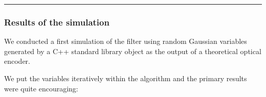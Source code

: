 \begin{center}\rule{0.5\linewidth}{0.5pt}\end{center}

\hypertarget{results-of-the-simulation}{%
\subsubsection{Results of the
simulation}\label{results-of-the-simulation}}

We conducted a first simulation of the filter using random Gaussian
variables generated by a C++ standard library object as the output of a
theoretical optical encoder.

We put the variables iteratively within the algorithm and the primary
results were quite encouraging:

\begin{Shaded}
\begin{Highlighting}[]
\OperatorTok{(}\OperatorTok{\textless{}} \OperatorTok{)}
\OperatorTok{\{}
    \OperatorTok{=} \OperatorTok{;}
    \OperatorTok{=} \OperatorTok{;}

    \OperatorTok{(}\OperatorTok{\textgreater{}} \OperatorTok{)}
    \OperatorTok{\{}
\OperatorTok{=} \OperatorTok{;}
\OperatorTok{=} \OperatorTok{;}
    \OperatorTok{\}}

\OperatorTok{{-}\textgreater{}}\OperatorTok{(}\OperatorTok{,}\OperatorTok{);}

    \OperatorTok{=}  \OperatorTok{+} \OperatorTok{(}\OperatorTok{(}\OperatorTok{));}
    \OperatorTok{++}\OperatorTok{[}\OperatorTok{];}

\OperatorTok{[}\OperatorTok{]} \OperatorTok{=}\OperatorTok{;}

\OperatorTok{=} \OperatorTok{(}\OperatorTok{,}\OperatorTok{,}\OperatorTok{);}


\end{Highlighting}
\end{Shaded}
